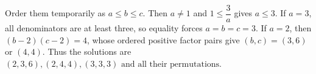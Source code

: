 Order them temporarily as $ a\le b\le c $. Then $ a\ne1 $ and $ 1\le\dfrac{3}{a}$ gives $ a\le3 $. If $ a=3 $, all denominators are at least three, so equality forces $ a=b=c=3 $. If $ a=2 $, then $(b-2)(c-2)=4 $, whose ordered positive factor pairs give $(b,c)=(3,6)$ or $(4,4)$. Thus the solutions are $\boxed{(2,3,6),(2,4,4),(3,3,3)\text{ and all their permutations}}$.
